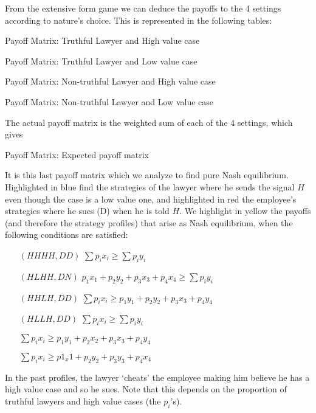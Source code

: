 From the extensive form game we can deduce the payoffs to the 4 settings according to nature's choice. This is represented in the following tables:

\begin{table}[H]
\centering
\setlength\tabcolsep{4pt}
\begin{minipage}{0.48\textwidth}
\centering
        {}
\caption*{Payoff Matrix: Truthful Lawyer and High value case}
\label{PM1} 
\end{minipage}%
\hfill
\begin{minipage}{0.48\textwidth}
\centering
        {}
\caption*{Payoff Matrix: Truthful Lawyer and Low value case}
\label{PM2} 
\end{minipage}%
\end{table}


\begin{table}[H]
\centering
\setlength\tabcolsep{4pt}
\begin{minipage}{0.48\textwidth}
\centering
        {}
\caption*{Payoff Matrix: Non-truthful Lawyer and High value case}
\label{PM3} 
\end{minipage}%
\hfill
\begin{minipage}{0.48\textwidth}
\centering
        {}
\caption*{Payoff Matrix: Non-truthful Lawyer and Low value case}
\label{PM4} 
\end{minipage}%
\end{table}

The actual payoff matrix is the weighted sum of each of the 4 settings, which gives

\begin{table}[H]
\centering
        {}
   \caption*{Payoff Matrix: Expected payoff matrix}
\end{table}

It is this last payoff matrix which we analyze to find pure Nash equilibrium. Highlighted in blue find the strategies of the lawyer where he sends the signal $H$ even though the case is a low value one, and highlighted in red the employee's strategies where he sues (D) when he is told $H$. We highlight in yellow the payoffs (and therefore the strategy profiles) that arise as Nash equilibrium, when the following conditions are satisfied:

\begin{enumerate}
    \item [$(HHHH, DD)$] $\sum p_i x_i\geq \sum p_i y_i $
    \item [$(HLHH, DN)$] $p_1x_1+p_2y_2+p_3x_3+p_4x_4\geq \sum p_iy_i$
    \item [$(HHLH, DD)$] $\sum p_i x_i \geq p_1y_1+p_2y_2+p_3x_3+p_4y_4$
    \item [$(HLLH, DD)$] $\sum p_i x_i \geq \sum p_i y_i$ 
    
    $\sum p_i x_i \geq  p_1y_1+p_2x_2+p_3x_3+p_4y_4$ 
    
    $\sum p_i x_i \geq p1_x1+p_2y_2+p_3y_3+p_4x_4$ 
\end{enumerate}


In the past profiles, the lawyer `cheats' the employee making him believe he has a high value case and so he sues. Note that this depends on the proportion of truthful lawyers and high value cases (the $p_i$'s). \\
